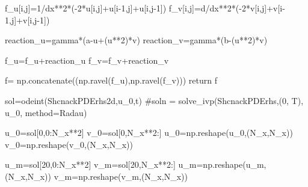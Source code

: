 \documentclass[
  letterpaper,
  DIV=11,
  numbers=noendperiod]{scrreprt}
\newenvironment{Shaded}{\begin{snugshade}}{\end{snugshade}}
\newcommand{\CommentTok}[1]{\textcolor[rgb]{0.37,0.37,0.37}{#1}}
\newcommand{\ControlFlowTok}[1]{\textcolor[rgb]{0.00,0.23,0.31}{#1}}
\newcommand{\DecValTok}[1]{\textcolor[rgb]{0.68,0.00,0.00}{#1}}
\newcommand{\NormalTok}[1]{\textcolor[rgb]{0.00,0.23,0.31}{#1}}
\newcommand{\OperatorTok}[1]{\textcolor[rgb]{0.37,0.37,0.37}{#1}}
\theoremstyle{plain}
\theoremstyle{definition}
\theoremstyle{plain}
\theoremstyle{remark}
\begin{document}
\begin{Shaded}
\begin{Highlighting}[]
\NormalTok{    f\_u[i,j]}\OperatorTok{=}\DecValTok{1}\OperatorTok{/}\NormalTok{dx}\OperatorTok{**}\DecValTok{2}\OperatorTok{*}\NormalTok{(}\OperatorTok{{-}}\DecValTok{2}\OperatorTok{*}\NormalTok{u[i,j]}\OperatorTok{+}\NormalTok{u[i}\OperatorTok{{-}}\DecValTok{1}\NormalTok{,j]}\OperatorTok{+}\NormalTok{u[i,j}\OperatorTok{{-}}\DecValTok{1}\NormalTok{]) }
\NormalTok{    f\_v[i,j]}\OperatorTok{=}\NormalTok{d}\OperatorTok{/}\NormalTok{dx}\OperatorTok{**}\DecValTok{2}\OperatorTok{*}\NormalTok{(}\OperatorTok{{-}}\DecValTok{2}\OperatorTok{*}\NormalTok{v[i,j]}\OperatorTok{+}\NormalTok{v[i}\OperatorTok{{-}}\DecValTok{1}\NormalTok{,j]}\OperatorTok{+}\NormalTok{v[i,j}\OperatorTok{{-}}\DecValTok{1}\NormalTok{]) }


\NormalTok{    reaction\_u}\OperatorTok{=}\NormalTok{gamma}\OperatorTok{*}\NormalTok{(a}\OperatorTok{{-}}\NormalTok{u}\OperatorTok{+}\NormalTok{(u}\OperatorTok{**}\DecValTok{2}\NormalTok{)}\OperatorTok{*}\NormalTok{v)}
\NormalTok{    reaction\_v}\OperatorTok{=}\NormalTok{gamma}\OperatorTok{*}\NormalTok{(b}\OperatorTok{{-}}\NormalTok{(u}\OperatorTok{**}\DecValTok{2}\NormalTok{)}\OperatorTok{*}\NormalTok{v)}

\NormalTok{    f\_u}\OperatorTok{=}\NormalTok{f\_u}\OperatorTok{+}\NormalTok{reaction\_u}
\NormalTok{    f\_v}\OperatorTok{=}\NormalTok{f\_v}\OperatorTok{+}\NormalTok{reaction\_v}



\NormalTok{    f}\OperatorTok{=}\NormalTok{ np.concatenate((np.ravel(f\_u),np.ravel(f\_v))) }
    \ControlFlowTok{return}\NormalTok{ f  }

\NormalTok{sol}\OperatorTok{=}\NormalTok{odeint(ShcnackPDErhs2d,u\_0,t)}
\CommentTok{\#soln = solve\_ivp(ShcnackPDErhs,(0, T), u\_0, method=\textquotesingle{}Radau\textquotesingle{})}


\NormalTok{u\_0}\OperatorTok{=}\NormalTok{sol[}\DecValTok{0}\NormalTok{,}\DecValTok{0}\NormalTok{:N\_x}\OperatorTok{**}\DecValTok{2}\NormalTok{]}
\NormalTok{v\_0}\OperatorTok{=}\NormalTok{sol[}\DecValTok{0}\NormalTok{,N\_x}\OperatorTok{**}\DecValTok{2}\NormalTok{:]}
\NormalTok{u\_0}\OperatorTok{=}\NormalTok{np.reshape(u\_0,(N\_x,N\_x))}
\NormalTok{v\_0}\OperatorTok{=}\NormalTok{np.reshape(v\_0,(N\_x,N\_x))}

\NormalTok{u\_m}\OperatorTok{=}\NormalTok{sol[}\DecValTok{20}\NormalTok{,}\DecValTok{0}\NormalTok{:N\_x}\OperatorTok{**}\DecValTok{2}\NormalTok{]}
\NormalTok{v\_m}\OperatorTok{=}\NormalTok{sol[}\DecValTok{20}\NormalTok{,N\_x}\OperatorTok{**}\DecValTok{2}\NormalTok{:]}
\NormalTok{u\_m}\OperatorTok{=}\NormalTok{np.reshape(u\_m,(N\_x,N\_x))}
\NormalTok{v\_m}\OperatorTok{=}\NormalTok{np.reshape(v\_m,(N\_x,N\_x))}


\end{Highlighting}
\end{Shaded}
\end{document}
